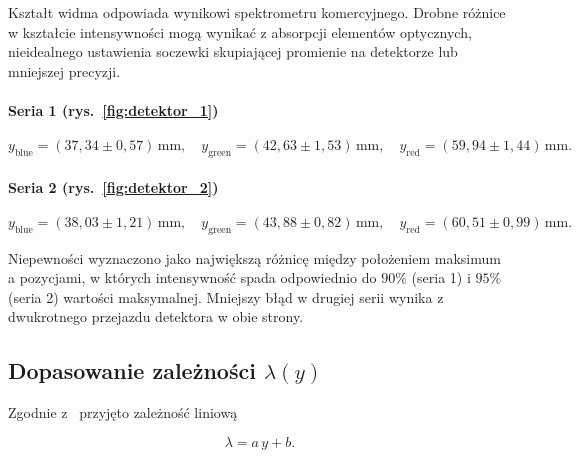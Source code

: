 \documentclass[12pt]{article}
\begin{document}
Kształt widma odpowiada wynikowi spektrometru komercyjnego. Drobne różnice w kształcie intensywności mogą wynikać z absorpcji elementów optycznych, nieidealnego ustawienia soczewki skupiającej promienie na detektorze lub mniejszej precyzji.

\paragraph{Seria 1 (rys.~\ref{fig:detektor_1})}
\[
  y_{\mathrm{blue}}  = (37{,}34 \pm 0{,}57)\,\mathrm{mm}, \quad
  y_{\mathrm{green}} = (42{,}63 \pm 1{,}53)\,\mathrm{mm}, \quad
  y_{\mathrm{red}}   = (59{,}94 \pm 1{,}44)\,\mathrm{mm}.
\]

\paragraph{Seria 2 (rys.~\ref{fig:detektor_2})}
\[
  y_{\mathrm{blue}}  = (38{,}03 \pm 1{,}21)\,\mathrm{mm}, \quad
  y_{\mathrm{green}} = (43{,}88 \pm 0{,}82)\,\mathrm{mm}, \quad
  y_{\mathrm{red}}   = (60{,}51 \pm 0{,}99)\,\mathrm{mm}.
\]

Niepewności wyznaczono jako największą różnicę między położeniem maksimum a pozycjami, w których intensywność spada odpowiednio do \(90\%\) (seria 1) i \(95\%\) (seria 2) wartości maksymalnej. Mniejszy błąd w drugiej serii wynika z dwukrotnego przejazdu detektora w obie strony.

\subsection*{Dopasowanie zależności \(\lambda(y)\)}

Zgodnie z~\cite{skrypt} przyjęto zależność liniową  

\[
  \lambda = a\,y + b.
\]
\end{document}
